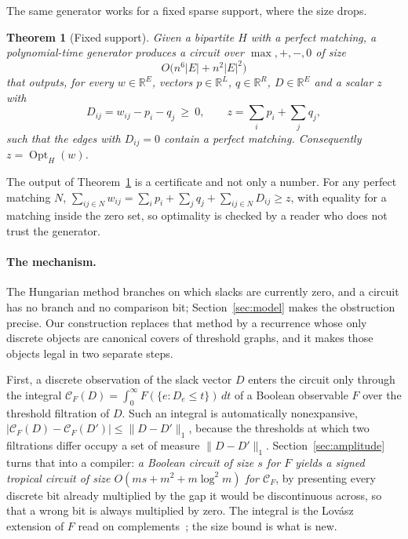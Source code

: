 \documentclass[11pt]{article}
\newtheorem{theorem}{Theorem}[section]
\newcommand{\Opt}{\operatorname{Opt}}
\begin{document}
The same generator works for a fixed sparse support, where the size drops.

\begin{theorem}[Fixed support]
\label{thm:main-support}
Given a bipartite $H$ with a perfect matching, a polynomial-time generator
produces a circuit over $\max,+,-,0$ of size
\begin{equation}
  O\bigl(n^{6}|E|+n^{2}|E|^{2}\bigr)
  \label{eq:main-support}
\end{equation}
that outputs, for every $w\in\mathbb R^{E}$, vectors $p\in\mathbb R^{L}$,
$q\in\mathbb R^{R}$, $D\in\mathbb R^{E}$ and a scalar $z$ with
\begin{equation}
  D_{ij}=w_{ij}-p_i-q_j\ \ge\ 0,
  \qquad
  z=\sum_ip_i+\sum_jq_j,
  \label{eq:dual}
\end{equation}
such that the edges with $D_{ij}=0$ contain a perfect matching.  Consequently
$z=\Opt_H(w)$.
\end{theorem}

The output of Theorem~\ref{thm:main-support} is a certificate and not only a
number.  For any perfect matching $N$,
$\sum_{ij\in N}w_{ij}=\sum_ip_i+\sum_jq_j+\sum_{ij\in N}D_{ij}\ge z$, with
equality for a matching inside the zero set, so optimality is checked by a
reader who does not trust the generator.

\paragraph{The mechanism.}
The Hungarian method branches on which slacks are currently zero, and a circuit
has no branch and no comparison bit; Section~\ref{sec:model} makes the
obstruction precise.  Our construction replaces that method by a recurrence
whose only discrete objects are canonical covers of threshold graphs, and it
makes those objects legal in two separate steps.

First, a discrete observation of the slack vector $D$ enters the circuit only
through the integral
$\mathcal C_F(D)=\int_0^{\infty}F(\{e:D_e\le t\})\,dt$ of a Boolean observable
$F$ over the threshold filtration of $D$.  Such an integral is automatically
nonexpansive, $|\mathcal C_F(D)-\mathcal C_F(D')|\le\|D-D'\|_1$, because the
thresholds at which two filtrations differ occupy a set of measure
$\|D-D'\|_1$.  Section~\ref{sec:amplitude} turns that into a compiler:
\emph{a Boolean circuit of size $s$ for $F$ yields a signed tropical circuit of
size $O(ms+m^{2}+m\log^{2}m)$ for $\mathcal C_F$}, by presenting every discrete
bit already multiplied by the gap it would be discontinuous across, so that a
wrong bit is always multiplied by zero.  The integral is the Lov\'asz extension
of $F$ read on complements~\cite{lovasz83}; the size bound is what is new.
\end{document}
